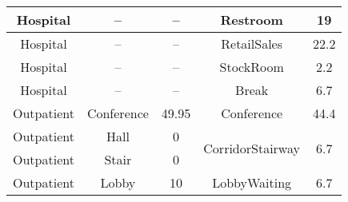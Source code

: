 \begin{table}
\begin{tabular}{|c|c|c|c|c|}
Hospital               & --                      & --                                                                                                            & Restroom                          & 19                                                                                                             \\ \hline
Hospital               & --                      & --                                                                                                            & RetailSales                       & 22.2                                                                                                           \\ \hline
Hospital               & --                      & --                                                                                                            & StockRoom                         & 2.2                                                                                                            \\ \hline
Hospital               & --                      & --                                                                                                            & Break                             & 6.7                                                                                                            \\ \hline
Outpatient             & Conference              & 49.95                                                                                                         & Conference                        & 44.4                                                                                                           \\ \hline
Outpatient             & Hall                    & 0                                                                                                             & \multirow{2}{*}{CorridorStairway} & \multirow{2}{*}{6.7}                                                                                           \\ \cline{1-3}
Outpatient             & Stair                   & 0                                                                                                             &                                   &                                                                                                                \\ \hline
Outpatient             & Lobby                   & 10                                                                                                            & LobbyWaiting                      & 6.7                                                                                                            \\ \hline

\end{tabular}
\end{table}
